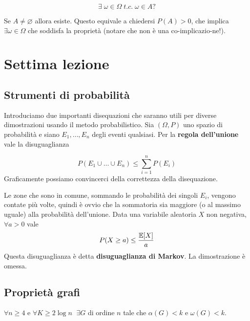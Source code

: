 \documentclass[12pt]{report}
\begin{document}
$$\exists \; \omega \in \Omega \;t.c.\; \omega \in A?$$

\noindent
Se $A \neq \varnothing$  allora esiste. Questo equivale a chiedersi $P(A) > 0$, che implica $\exists \omega \in \Omega$ che soddisfa la proprietà (notare che non è una 
co-implicazio-ne!).


\chapter{Settima lezione}

\section{Strumenti di probabilità}
Introduciamo due importanti disequazioni che saranno utili per diverse dimostrazioni usando il metodo probabilistico. Sia $(\Omega,P)$ uno spazio di probabilità e siano $E_1,\dots,E_n$ degli eventi qualsiasi. Per la \textbf{regola dell'unione} vale la disuguaglianza

$$P(E_1 \cup \dots \cup E_n) \leq \sum_{i = 1}^n P(E_i) $$
Graficamente possiamo convincerci della correttezza della disequazione.


\noindent 
Le zone che sono in comune, sommando le probabilità dei singoli $E_i$, vengono contate più volte, quindi è ovvio che la sommatoria sia maggiore (o al massimo uguale) alla probabilità dell'unione.
Data una variabile aleatoria $X$ non negativa, $\forall a > 0$ vale
$$P(X \geq a ) \leq \frac{\mathbb{E}[X]}{a}$$
Questa disuguaglianza è detta \textbf{disuguaglianza di Markov}. La dimostrazione è omessa.

\section{Proprietà grafi}

\begin{fatto}
    $\forall n \geq 4$ e $\forall K \geq 2\log{n}$ $\; \exists G$ di ordine $n$ tale che $\alpha(G) < k$ e $\omega(G) < k$.
\end{fatto}
\end{document}
